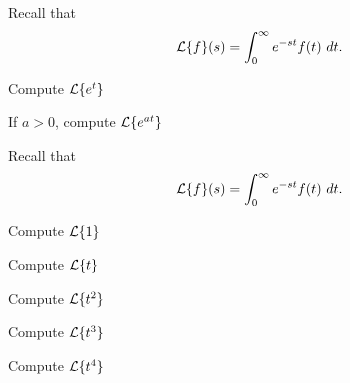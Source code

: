 \begin{applicationActivities}
\begin{activity}{5}
Recall that \[\mathcal{L}\{f\}(s)=\int _0 ^\infty e^{-st} f(t)\ dt.\]
\begin{subactivity}
Compute \(\mathcal{L}\{e^t\}\)
\end{subactivity}
\begin{subactivity}
If \(a>0\), compute \(\mathcal{L}\{e^{at}\}\)
\end{subactivity}
\end{activity}

\begin{activity}{15}
Recall that \[\mathcal{L}\{f\}(s)=\int _0 ^\infty e^{-st} f(t)\ dt.\]
\begin{subactivity}
Compute \(\mathcal{L}\{1\}\)
\end{subactivity}
\begin{subactivity}
Compute \(\mathcal{L}\{t\}\)
\end{subactivity}
\begin{subactivity}
Compute \(\mathcal{L}\{t^2\}\)
\end{subactivity}
\begin{subactivity}
Compute \(\mathcal{L}\{t^3\}\)
\end{subactivity}
\begin{subactivity}
Compute \(\mathcal{L}\{t^4\}\)
\end{subactivity}
\end{activity}





\end{applicationActivities}
